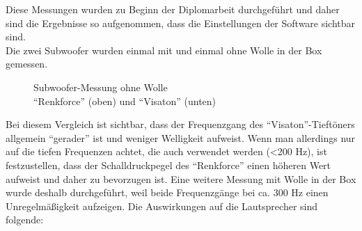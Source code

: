 \newpage
Diese Messungen wurden zu Beginn der Diplomarbeit durchgeführt und daher sind die Ergebnisse so aufgenommen, dass die Einstellungen der Software sichtbar sind.\\ %
Die zwei Subwoofer wurden einmal mit und einmal ohne Wolle in der Box gemessen. 
\begin{figure} [H]
	\centering
	\quad
	\caption{Subwoofer-Messung ohne Wolle\\ \enquote{Renkforce} (oben) und \enquote{Visaton} (unten)}
	\label{fig:5.3.3.2}
\end{figure}
Bei diesem Vergleich ist sichtbar, dass der Frequenzgang des \enquote{Visaton}-Tieftöners allgemein \enquote{gerader} ist und weniger Welligkeit aufweist.
Wenn man allerdings nur auf die tiefen Frequenzen achtet, die auch verwendet werden (<200 Hz), ist festzustellen, dass der Schalldruckpegel des \enquote{Renkforce} einen höheren Wert aufweist und daher zu bevorzugen ist.\newpage
Eine weitere Messung mit Wolle in der Box wurde deshalb durchgeführt, weil beide Frequenzgänge bei ca. 300 Hz einen Unregelmäßigkeit aufzeigen.
Die Auswirkungen auf die Lautsprecher sind folgende:
